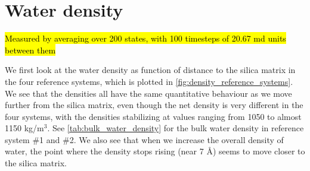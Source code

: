 \section{Water density\label{sec:results_density}}

\hl{Measured by averaging over 200 states, with 100 timesteps of 20.67 md units between them}

We first look at the water density as function of distance to the silica matrix in the four reference systems, which is plotted in \cref{fig:density_reference_systems}. We see that the densities all have the same quantitative behaviour as we move further from the silica matrix, even though the net density is very different in the four systems, with the densities stabilizing at values ranging from 1050 to almost 1150 kg/m$^3$. See \cref{tab:bulk_water_density} for the bulk water density in reference system \#1 and \#2. We also see that when we increase the overall density of water, the point where the density stops rising (near 7 \AA) seems to move closer to the silica matrix.

